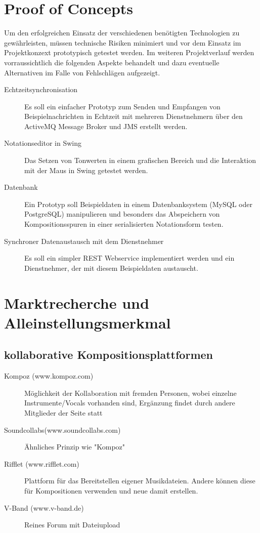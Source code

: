 \documentclass[12pt]{scrartcl}
\begin{document}

\section{Proof of Concepts}
Um den erfolgreichen Einsatz der verschiedenen benötigten Technologien zu gewährleisten, müssen technische Risiken minimiert und vor dem Einsatz im Projektkonzext prototypisch getestet werden. Im weiteren Projektverlauf werden vorraussichtlich die folgenden Aspekte behandelt und dazu eventuelle Alternativen im Falle von Fehlschlägen aufgezeigt.

\begin{description}
\item[Echtzeitsynchronisation]
Es soll ein einfacher Prototyp zum Senden und Empfangen von Beispielnachrichten in Echtzeit mit mehreren Dienstnehmern über den ActiveMQ Message Broker und JMS erstellt werden.
\item[Notationseditor in Swing]
Das Setzen von Tonwerten in einem grafischen Bereich und die Interaktion mit der Maus in Swing getestet werden.
\item[Datenbank]
Ein Prototyp soll Beispieldaten in einem Datenbanksystem (MySQL oder PostgreSQL) manipulieren und besonders das Abspeichern von Kompositionsspuren in einer serialisierten Notationsform testen.
\item[Synchroner Datenaustausch mit dem Dienstnehmer]
Es soll ein simpler REST Webservice implementiert werden und ein Dienstnehmer, der mit diesem Beispieldaten austauscht.
\end{description}



\section{Marktrecherche und Alleinstellungsmerkmal}

\subsection{kollaborative Kompositionsplattformen}
\parskip 12pt
\begin{description}
\item[Kompoz (www.kompoz.com)]
Möglichkeit der Kollaboration mit fremden Personen, wobei
einzelne Instrumente/Vocals vorhanden sind,
Ergänzung findet durch andere Mitglieder der Seite statt

\item[Soundcollabs(www.soundcollabs.com)]
Ähnliches Prinzip wie "Kompoz"

\item[Rifflet (www.rifflet.com)]
Plattform für das Bereitstellen eigener Musikdateien. Andere können diese für Kompositionen verwenden und neue damit erstellen.

\item[V-Band (www.v-band.de)]
Reines Forum mit Dateiupload

\end{description}
\end{document}
